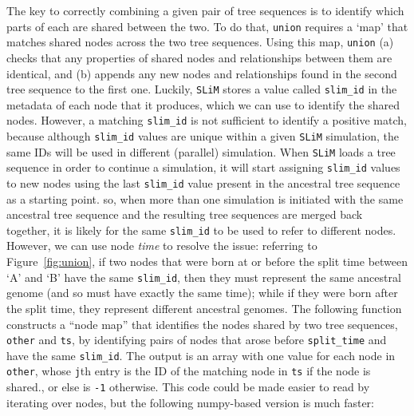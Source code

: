 \documentclass[12pt]{article}
\newcommand{\slim}[0]{\texttt{SLiM}\xspace}
\begin{document}
The key to correctly combining a given pair of tree sequences is to identify which parts of each are shared between the two.
To do that, \verb|union| requires a `map' that matches shared nodes across the two tree sequences.
Using this map, \verb|union| (a) checks that any properties of shared nodes and relationships between them are identical, and
(b) appends any new nodes and relationships found in the second tree sequence to the first one.
Luckily, \slim stores a value called \verb|slim_id| in the metadata of each node that it produces,
which we can use to identify the shared nodes.
However, a matching \verb|slim_id| is not sufficient to identify a positive match,
because although \verb|slim_id| values are unique within a given \slim simulation,
the same IDs will be used in different (parallel) simulation.
When \slim loads a tree sequence in order to continue a simulation,
it will start assigning \verb|slim_id| values to new nodes using the last \verb|slim_id| value
present in the ancestral tree sequence as a starting point.
so, when more than one simulation is initiated with the same
ancestral tree sequence and the resulting tree sequences are merged back together, it is likely for the same \verb|slim_id| to be used to refer to different nodes.
However, we can use node \emph{time} to resolve the issue:
referring to Figure~\ref{fig:union}, if two nodes that were born at or before the split time between `A' and `B'
have the same \verb|slim_id|, then they must represent the same ancestral genome (and so must have exactly the same time);
while if they were born after the split time, they represent different ancestral genomes.
The following function constructs a ``node map'' that identifies the nodes shared by two tree sequences, \verb|other| and \verb|ts|,
by identifying pairs of nodes that arose before \verb|split_time| and have the same \verb|slim_id|.
The output is an array with one value for each node in \verb|other|,
whose \verb|j|th entry is the ID of the matching node in \verb|ts| if the node is shared.,
or else is \verb|-1| otherwise.
This code could be made easier to read by iterating over nodes,
but the following numpy-based version is much faster:
\end{document}
